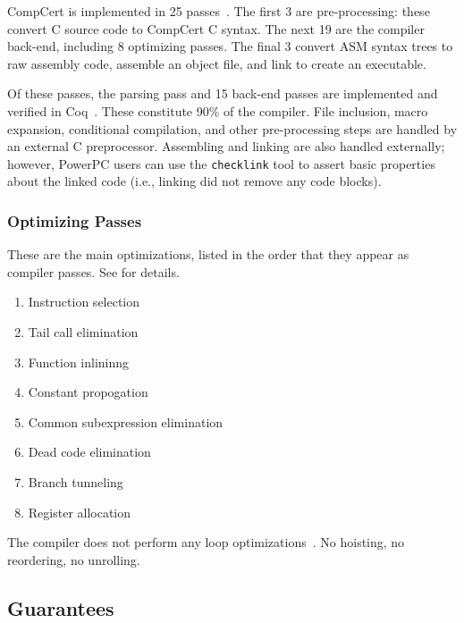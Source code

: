 CompCert is implemented in 25 passes~\cite{refman}.
The first 3 are pre-processing: these convert C source code to CompCert C syntax.
The next 19 are the compiler back-end, including 8 optimizing passes.
The final 3 convert ASM syntax trees to raw assembly code, assemble an object file, and link to create an executable.

Of these passes, the parsing pass and 15 back-end passes are implemented and verified in Coq~\cite{refman}.
These constitute 90\% of the compiler.
File inclusion, macro expansion, conditional compilation, and other pre-processing steps are handled by an external C preprocessor.
Assembling and linking are also handled externally; however, PowerPC users can use the {\tt checklink} tool to assert basic properties about the linked code (i.e., linking did not remove any code blocks).


\subsubsection{Optimizing Passes}
These are the main optimizations, listed in the order that they appear as compiler passes.
See  for details.

\begin{multicols}{2}
\begin{enumerate}
\item Instruction selection
\item Tail call elimination
\item Function inlininng
\item Constant propogation
\item Common subexpression elimination
\item Dead code elimination
\item Branch tunneling
\item Register allocation
\end{enumerate}
\end{multicols}

The compiler does not perform any loop optimizations~\cite{refman}.
No hoisting, no reordering, no unrolling.


\subsection{Guarantees}
\label{sec:guarantees}


